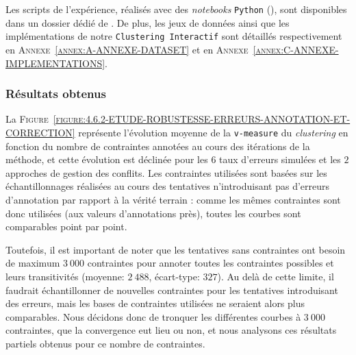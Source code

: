 			\begin{leftBarInformation}
				Les scripts de l'expérience, réalisés avec des \textit{notebooks} \texttt{Python} (\cite{van-rossum-drake:2009:python-reference-manual}), sont disponibles dans un dossier dédié de \cite{schild:2021:cognitivefactory-interactiveclusteringcomparativestudy}.
				De plus, les jeux de données ainsi que les implémentations de notre \texttt{Clustering Interactif} sont détaillés respectivement en \textsc{Annexe~\ref{annex:A-ANNEXE-DATASET}} et en \textsc{Annexe~\ref{annex:C-ANNEXE-IMPLEMENTATIONS}}.
			\end{leftBarInformation}

		\subsubsection{Résultats obtenus}
		
			La \textsc{Figure~\ref{figure:4.6.2-ETUDE-ROBUSTESSE-ERREURS-ANNOTATION-ET-CORRECTION}} représente l'évolution moyenne de la \texttt{v-measure} du \textit{clustering} en fonction du nombre de contraintes annotées au cours des itérations de la méthode, et cette évolution est déclinée pour les $6$ taux d'erreurs simulées et les $2$ approches de gestion des conflits.
			Les contraintes utilisées sont basées sur les échantillonnages réalisées au cours des tentatives n'introduisant pas d'erreurs d'annotation par rapport à la vérité terrain : comme les mêmes contraintes sont donc utilisées (aux valeurs d'annotations près), toutes les courbes sont comparables point par point.
			
			\begin{leftBarWarning}
				Toutefois, il est important de noter que les tentatives sans contraintes ont besoin de maximum $3~000$ contraintes pour annoter toutes les contraintes possibles et leurs transitivités (moyenne: $2~488$, écart-type: $327$).
				Au delà de cette limite, il faudrait échantillonner de nouvelles contraintes pour les tentatives introduisant des erreurs, mais les bases de contraintes utilisées ne seraient alors plus comparables.
				Nous décidons donc de tronquer les différentes courbes à $3~000$ contraintes, que la convergence eut lieu ou non, et nous analysons ces résultats partiels obtenus pour ce nombre de contraintes.
			\end{leftBarWarning}
			
